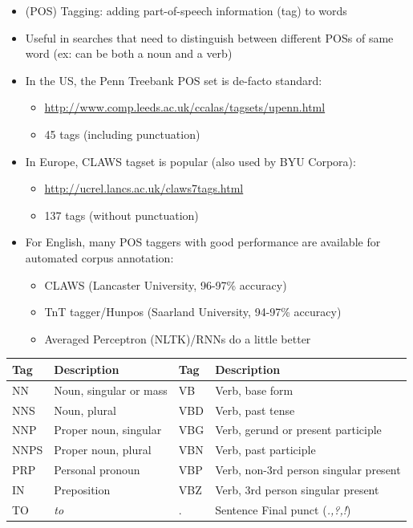 \documentclass[a4paper,landscape,headrule,footrule,xetex]{foils}
\begin{document}

\begin{itemize}
\item  (POS) Tagging: adding part-of-speech information (tag) to words
\item  Useful in searches that need to distinguish between different POSs of same word
(ex:  can be both a noun and a verb)
\item  In the US, the Penn Treebank POS set is de-facto standard:
  \begin{itemize}
  \item  \url{http://www.comp.leeds.ac.uk/ccalas/tagsets/upenn.html}
  \item 45 tags (including punctuation)
  \end{itemize}
\item  In Europe, CLAWS tagset is popular (also used by BYU Corpora):
  \begin{itemize}
  \item   \url{http://ucrel.lancs.ac.uk/claws7tags.html}
  \item 137 tags (without punctuation)
  \end{itemize}
\item  For English, many POS taggers with good performance are available for
  automated corpus annotation:
  \begin{itemize}
  \item  CLAWS (Lancaster University, 96-97\% accuracy)%
  \item  TnT tagger/Hunpos (Saarland University, 94-97\% accuracy)
  \item  Averaged Perceptron (NLTK)/RNNs do a little better
  \end{itemize}
\end{itemize}



\noindent\begin{tabular}{llll}
  Tag & Description  &   Tag & Description \\
\hline
NN   & Noun, singular or mass  & VB   & Verb, base form    \\                   
NNS  & Noun, plural            & VBD  & Verb, past tense    \\                  
NNP  & Proper noun, singular   & VBG  & Verb, gerund or present participle  \\  
NNPS & Proper noun, plural     & VBN  & Verb, past participle               \\  
PRP  & Personal pronoun        & VBP  & Verb, non-3rd person singular present \\
IN   & Preposition             & VBZ  & Verb, 3rd person singular present     \\
TO   & \textit{to}             & .    & Sentence Final punct (\textit{.,?,!})
\end{tabular}
\end{document}
